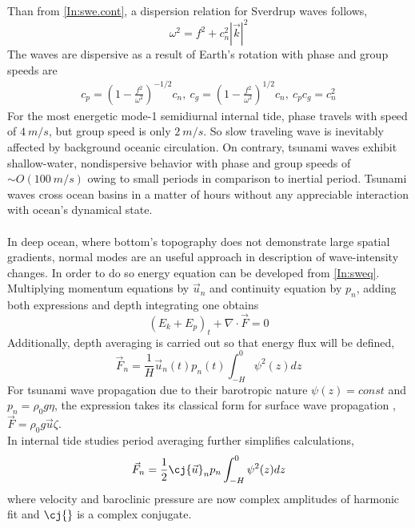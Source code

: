 \documentclass[12pt]{article}
\begin{document}
Than from \eqref{In:swe.cont}, a dispersion relation for Sverdrup waves follows,
\begin{equation}
\omega^2 = f^2 + c^2_n |\vec{k}|^2
\end{equation}
The waves are dispersive as a result of Earth's rotation with phase and group speeds are
\begin{align}
c_{p} = (1 - \frac{f^2}{\omega^2})^{-1/2} c_n,~c_g = (1 - \frac{f^2}{\omega^2})^{1/2} c_n,~c_p c_g 
= c_n^2
\end{align}
For the most energetic mode-1 semidiurnal internal tide, phase travels with speed of $4~m/s$, but 
group speed is only $2~m/s$. So slow traveling wave is inevitably affected by background 
oceanic circulation. On contrary, tsunami waves exhibit shallow-water, nondispersive behavior with 
phase and group speeds of $\sim O(100~m/s)$ owing to small periods in comparison to inertial 
period. Tsunami waves cross ocean basins in a matter of hours without any appreciable 
interaction with ocean's dynamical state.\\~\\
In deep ocean, where bottom's topography does not demonstrate large spatial gradients, normal 
modes are an useful approach in description of wave-intensity changes. In order to do so energy 
equation can be developed from \eqref{In:sweq}. Multiplying momentum equations by $\vec{u}_n$ and 
continuity equation by $p_n$, adding both expressions and depth integrating one obtains
\begin{equation}
(E_k + E_p)_t + \nabla \cdot \vec{F} = 0 \label{In:eneq}
\end{equation}
Additionally, depth averaging is carried out so that energy flux will be defined,
\begin{equation}
\vec{F}_n = \frac{1}{H} \vec{u}_n(t) p_n(t) \int_{-H}^0 \psi^2(z) dz \label{In:fldef}
\end{equation}
For tsunami wave propagation due to their barotropic nature $\psi(z) = const$ and $p_n = \rho_0 g 
\eta$, the expression takes its classical form for surface wave propagation 
\citep{henry2001representation}, $\vec{F} = \rho_0 g \vec{u} \zeta$.\\
In internal tide studies period averaging further simplifies calculations,
\begin{align}
\vec{F}_n = \frac{1}{2} \cj{\vec{u}}_n p_n \int_{-H}^0 \psi^2(z) dz
\end{align}
where velocity and baroclinic pressure are now complex amplitudes of harmonic fit and $\cj{}$ is a 
complex conjugate.\\
\end{document}
